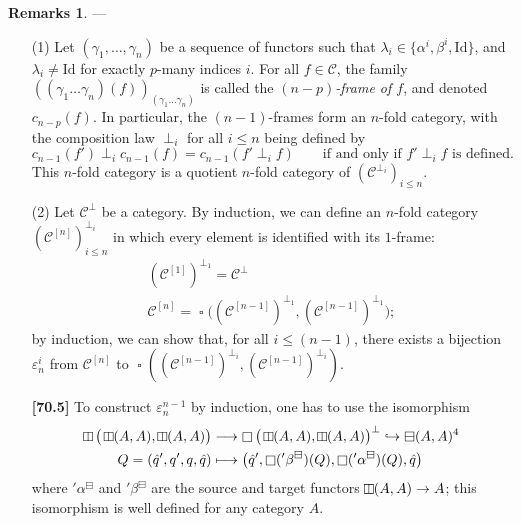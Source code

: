 \documentclass[a4paper,fleqn]{article}
\theoremstyle{plain}
\theoremstyle{definition}
\newtheorem*{remarks}{Remarks}
\newenvironment{longcomm}[1]
  {\noindent\textbf{[#1]}\rmfamily}
  {}
\renewcommand{\leq}{\leqslant}
\newcommand{\CC}{\mathcal{C}}
\newcommand{\Id}{\mathrm{Id}}
\newcommand{\hsqbox}{{\boxminus}}
\newcommand{\vsqbox}{{\rotatebox{90}{$\boxminus$}}}
\DeclareMathOperator{\sq}{\square}
\DeclareMathOperator{\hsq}{\raisebox{-.05em}{$\hsqbox$}}
\DeclareMathOperator{\vsq}{\raisebox{-.1em}{$\vsqbox$}}
\begin{document}
\begin{remarks}
  ---
  \begin{enumerate}
    \item[\normalfont(1)]
      Let $(\gamma_1,\ldots,\gamma_n)$ be a sequence of functors such that $\lambda_i\in\{\alpha^i,\beta^i,\Id\}$, and $\lambda_i\neq\Id$ for exactly $p$-many indices $i$.
      For all $f\in\CC$, the family $((\gamma_1\ldots\gamma_n)(f))_{(\gamma_1\ldots\gamma_n)}$ is called the \emph{$(n-p)$-frame of $f$}, and denoted $c_{n-p}(f)$.
      In particular, the $(n-1)$-frames form an $n$-fold category, with the composition law $\perp_i$ for all $i\leq n$ being defined by
      \[
        c_{n-1}(f')\perp_i c_{n-1}(f)
        = c_{n-1}(f'\perp_i f)
        \qquad\text{if and only if $f'\perp_i f$ is defined.}
      \]
      This $n$-fold category is a quotient $n$-fold category of $(\CC^{\perp_i})_{i\leq n}$.

    \item[\normalfont(2)]
      Let $\CC^\perp$ be a category.
      By induction, we can define an $n$-fold category $(\CC^{[n]})_{i\leq n}^{\perp_i}$ in which every element is identified with its $1$-frame:
      \[
        \begin{gathered}
          (\CC^{[1]})^{\perp_1}
          = \CC^\perp
        \\\CC^{[n]}
          = \sq\big(
            (\CC^{[n-1]})^{\perp_1}, (\CC^{[n-1]})^{\perp_1}
          \big);
        \end{gathered}
      \]
      by induction, we can show that, for all $i\leq(n-1)$, there exists a bijection $\varepsilon_n^i$ from $\CC^{[n]}$ to $\sq((\CC^{[n-1]})^{\perp_i},(\CC^{[n-1]})^{\perp_i})$.

      \begin{longcomm}{70.5}
        To construct $\varepsilon_n^{n-1}$ by induction, one has to use the isomorphism
        \[
          \begin{aligned}
            \vsq\big(\vsq(A,A),\vsq(A,A)\big)
            &\longrightarrow
            \sq\big(\vsq(A,A),\vsq(A,A)\big)^\perp
            \hookrightarrow \hsq(A,A)^4
          \\Q=(\hat{q}',q',q,\hat{q})
            &\longmapsto
            \big(
              \hat{q}',
              \sq({}'\beta^\hsqbox)(Q),
              \sq({}'\alpha^\hsqbox)(Q),
              \hat{q}
            \big)
          \end{aligned}
        \]
        where ${}'\alpha^\hsqbox$ and ${}'\beta^\hsqbox$ are the source and target functors $\vsq(A,A)\to A$;
        this isomorphism is well defined for any category $A$.


\end{longcomm}
\end{enumerate}
\end{remarks}
\end{document}
